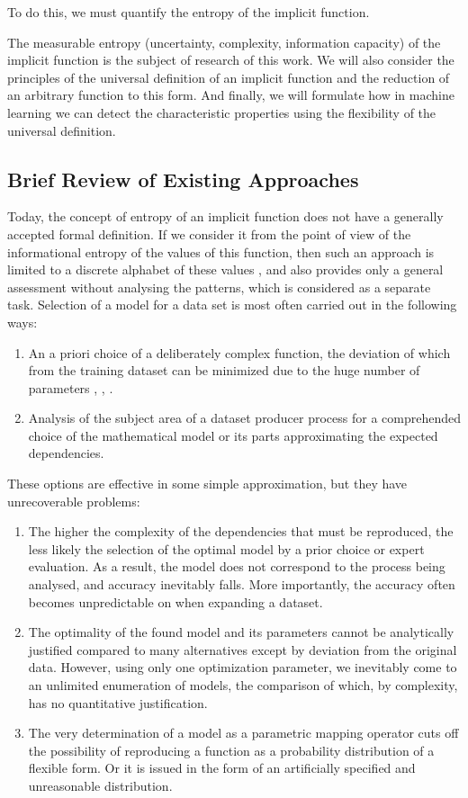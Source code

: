 \documentclass[a4paper, 11pt, oneside]{book}
\begin{document}
To do this, we must quantify the entropy of the implicit function.

The measurable entropy (uncertainty, complexity, information capacity) of the implicit function is the subject of research of this work. We will also consider the principles of the universal definition of an implicit function and the reduction of an arbitrary function to this form. And finally, we will formulate how in machine learning we can detect the characteristic properties using the flexibility of the universal definition.

\subsection{Brief Review of Existing Approaches}
Today, the concept of entropy of an implicit function does not have a generally accepted formal definition. If we consider it from the point of view of the informational entropy of the values of this function, then such an approach is limited to a discrete alphabet of these values \cite{Shannon_book}\relax, and also provides only a general assessment without analysing the patterns, which is considered as a separate task. Selection of a model for a data set is most often carried out in the following ways:
\begin{enumerate}
	\item An a priori choice of a deliberately complex function, the deviation of which from the training dataset can be minimized due to the huge number of parameters \cite{KollerFriedman_book}\relax, \cite{Frydenberg_book}\relax, \cite{RichardsonSpirtes_book}\relax.
  \item Analysis of the subject area of a dataset producer process for a comprehended choice of the mathematical model or its parts approximating the expected dependencies.
\end{enumerate}
These options are effective in some simple approximation, but they have unrecoverable problems:
\begin{enumerate}
	\item The higher the complexity of the dependencies that must be reproduced, the less likely the selection of the optimal model by a prior choice or expert evaluation. As a result, the model does not correspond to the process being analysed, and accuracy inevitably falls. More importantly, the accuracy often becomes unpredictable on when expanding a dataset.
  \item The optimality of the found model and its parameters cannot be analytically justified compared to many alternatives except by deviation from the original data. However, using only one optimization parameter, we inevitably come to an unlimited enumeration of models, the comparison of which, by complexity, has no quantitative justification.
  \item The very determination of a model as a parametric mapping operator cuts off the possibility of reproducing a function as a probability distribution of a flexible form. Or it is issued in the form of an artificially specified and unreasonable distribution.
\end{enumerate}
\end{document}

